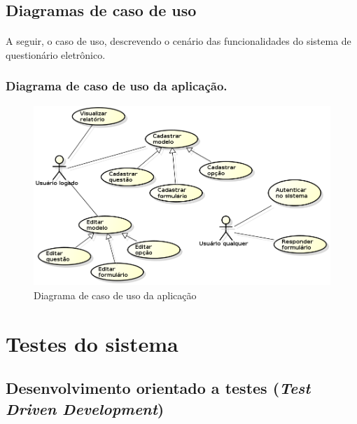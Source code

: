 \documentclass[11pt]{article}
\begin{document}
  \clearpage
        
  
    \subsection{Diagramas de caso de uso}
    
      \paragraph{}
      A seguir, o caso de uso, descrevendo o cenário das funcionalidades do sistema de questionário eletrônico.

    
      \subsubsection{Diagrama de caso de uso da aplicação.}

        \begin{figure}[h!]
          \centering
          \includegraphics[width=1.0\textwidth]{uc_diagram.png}
          \caption{Diagrama de caso de uso da aplicação}
        \end{figure}
        
  \clearpage
      
  \section{Testes do sistema}
  
    \subsection{Desenvolvimento orientado a testes ({\em Test Driven Development})}
    
    \paragraph{}
\end{document}
